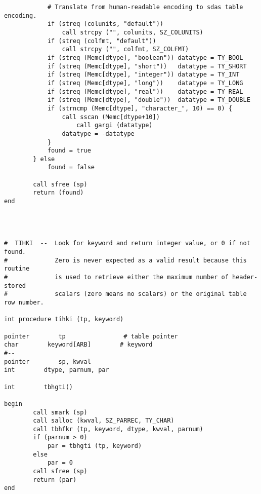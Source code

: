 \begin{verbatim}
            # Translate from human-readable encoding to sdas table encoding.
            if (streq (colunits, "default")) 
                call strcpy ("", colunits, SZ_COLUNITS)
            if (streq (colfmt, "default")) 
                call strcpy ("", colfmt, SZ_COLFMT)
            if (streq (Memc[dtype], "boolean")) datatype = TY_BOOL
            if (streq (Memc[dtype], "short"))   datatype = TY_SHORT
            if (streq (Memc[dtype], "integer")) datatype = TY_INT
            if (streq (Memc[dtype], "long"))    datatype = TY_LONG
            if (streq (Memc[dtype], "real"))    datatype = TY_REAL
            if (streq (Memc[dtype], "double"))  datatype = TY_DOUBLE
            if (strncmp (Memc[dtype], "character_", 10) == 0) { 
                call sscan (Memc[dtype+10])
                    call gargi (datatype)
                datatype = -datatype
            }
            found = true
        } else 
            found = false

        call sfree (sp)
        return (found)
end




#  TIHKI  --  Look for keyword and return integer value, or 0 if not found.
#             Zero is never expected as a valid result because this routine
#             is used to retrieve either the maximum number of header-stored
#             scalars (zero means no scalars) or the original table row number.

int procedure tihki (tp, keyword)

pointer        tp                # table pointer
char        keyword[ARB]        # keyword
#--
pointer        sp, kwval
int        dtype, parnum, par

int        tbhgti()

begin
        call smark (sp)
        call salloc (kwval, SZ_PARREC, TY_CHAR)
        call tbhfkr (tp, keyword, dtype, kwval, parnum)
        if (parnum > 0)
            par = tbhgti (tp, keyword)
        else
            par = 0
        call sfree (sp)
        return (par)
end
\end{verbatim}
\newpage

